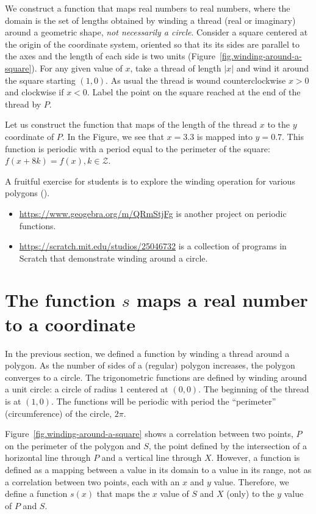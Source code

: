 We construct a function that maps real numbers to real numbers, where the domain is the set of lengths obtained by winding a thread (real or imaginary) around a geometric shape, \emph{not necessarily a circle}.
Consider a square centered at the origin of the coordinate system, oriented so that its its sides are parallel to the axes and the length of each side is two units (Figure~\ref{fig.winding-around-a-square}).
For any given value of $x$, take a thread of length $|x|$ and wind it around the square starting $(1,0)$. As usual the thread is wound counterclockwise $x>0$ and clockwise if $x <0$.
Label the point on the square reached at the end of the thread by $P$.


Let us construct the function that maps of the length of the thread $x$ to the $y$ coordinate of $P$. In the Figure, we see that $x=3.3$ is mapped into $y=0.7$.
This function is periodic with a period equal to the perimeter of the square: $f(x+8k)=f(x), k\in \mathcal{Z}$.

A fruitful exercise for students is to explore the winding operation for various polygons ().


\begin{itemize}
\item \url{https://www.geogebra.org/m/QRmStjFg} is another project on periodic functions.
\item \url{https://scratch.mit.edu/studios/25046732} is a collection of programs in Scratch that demonstrate winding around a circle.
\end{itemize}


\section{The function \texorpdfstring{$s$}{s} maps a real number to a coordinate}

In the previous section, we defined a function by winding a thread around a polygon. As the number of sides of a (regular) polygon increases, the polygon converges to a circle. The trigonometric functions are defined by winding around a unit circle: a circle of radius $1$ centered at $(0,0)$. The beginning of the thread is at $(1,0)$. The functions will be periodic with period the ``perimeter'' (circumference) of the circle, $2\pi$.

Figure~\ref{fig.winding-around-a-square} shows a correlation between two points, $P$ on the perimeter of the polygon and $S$, the point defined by the intersection of a horizontal line through $P$ and a vertical line through $X$.
However, a function is defined as a mapping between a value in its domain to a value in its range, not as a correlation between two points, each with an $x$ and $y$ value.
Therefore, we define a function $s(x)$ that maps the $x$ value of $S$ and $X$ (only) to the $y$ value of $P$ and $S$.

